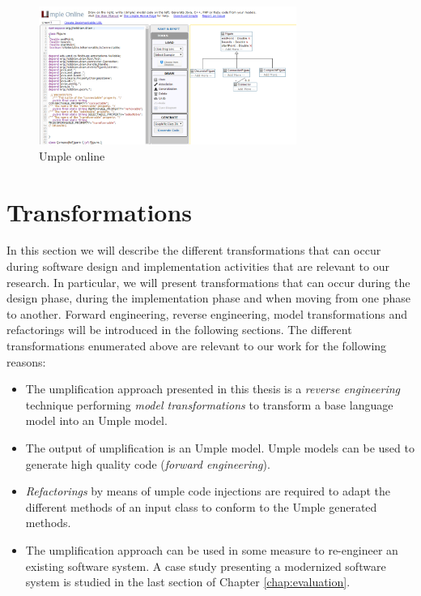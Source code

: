 \begin{figure}[h]
\centering
\includegraphics[width=0.75\textwidth]{Figures/uonline.png} 
\caption{Umple online}
\label{fig:uonline}
\end{figure}


\section{Transformations}

In this section we will describe the different transformations that can occur during software design and implementation activities that are relevant to our research. In particular, we will present transformations that can occur during the design phase, during the implementation phase and when moving from one phase to another. Forward engineering, reverse engineering, model transformations and refactorings will be introduced in the following sections. The different transformations enumerated above are relevant to our work for the following reasons: 

\begin{itemize}
\item The umplification approach presented in this thesis is a \textit{reverse engineering} technique performing \textit{model transformations} to transform a base language model into an Umple model. 
\item The output of umplification is an Umple model. Umple models can be used to generate high quality code (\textit{forward engineering}).
\item \textit{Refactorings} by means of umple code injections are required to adapt the different methods of an input class to conform to the Umple generated methods.
\item The umplification approach can be used in some measure to re-engineer an existing software system. A case study presenting a modernized software system is studied in the last section of Chapter \ref{chap:evaluation}.
\end{itemize}

